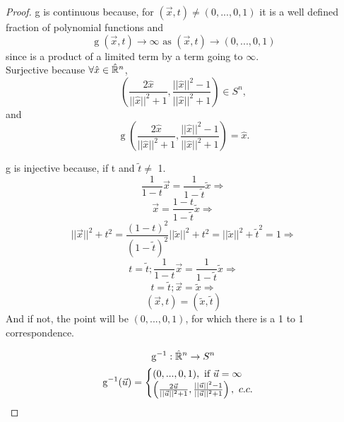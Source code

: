 \begin{proof} \label{proofghomeo}
g is continuous because, for $(\vec{x},t)\neq(0, ..., 0, 1)$ it is a well defined fraction of polynomial functions and 
\begin{equation*}
    \operatorname{g}(\vec{x}, t) \rightarrow \infty \text{ as }(\vec{x},t) \rightarrow (0, ..., 0, 1)
\end{equation*}
since is a product of a limited term by a term going to $\infty$.\\
Surjective because $\forall \hat{x} \in \hat{\mathbb{R}}^n$,
\begin{equation*}
    \left(\frac{2\hat{x}}{||\hat{x}||^2+1},\frac{||\hat{x}||^2-1}{||\hat{x}||^2+1}\right) \in S^n,
\end{equation*}
and
\begin{equation*}
\operatorname{g}\left(\frac{2\hat{x}}{||\hat{x}||^2+1},\frac{||\hat{x}||^2-1}{||\hat{x}||^2+1}\right) = \hat{x}.
\end{equation*}

g is injective because, if t and $\tilde{t} \neq$ 1.
\begin{equation*}
\frac{1}{1 - t} \vec{x} =  \frac{1}{1 - \tilde{t}} \tilde{x} \Rightarrow    
\end{equation*}
\begin{equation*}
\vec{x} =  \frac{1 - t}{1 - \tilde{t}} \tilde{x} \Rightarrow 
\end{equation*}
\begin{equation*}
    ||\vec{x}||^2 + t^2 =  \frac{(1 - t)^2}{(1 - \tilde{t})^2}||\tilde{x}||^2 + t^2 = ||\tilde{x}||^2 + \tilde{t}^2 = 1 \Rightarrow
\end{equation*}
\begin{equation*}
   t = \tilde{t}; \frac{1}{1 - t} \vec{x} =  \frac{1}{1 - \tilde{t}} \tilde{x} \Rightarrow 
\end{equation*}
\begin{equation*}
    t = \tilde{t}; \vec{x} = \tilde{x} \Rightarrow
\end{equation*}
\begin{equation*}
    (\vec{x},t) = (\tilde{x}, \tilde{t})
\end{equation*}
And if not, the point will be $(0, ..., 0, 1)$, for which there is a 1 to 1 correspondence.

\begin{gather*}
\operatorname{g}^{-1} : \hat{\mathbb{R}}^n \rightarrow S^n \\
\operatorname{g}^{-1}(\vec{u}) =
    \begin{cases}
        (0, ..., 0, 1), \text{ if } \vec{u} = \infty \\
        \left( \frac{2\vec{u}}{||\vec{u}||^2+1}, \frac{||\vec{u}||^2-1}{||\vec{u}||^2+1} \right), \mbox{ } c.c.
    \end{cases}
\end{gather*}


\end{proof}
